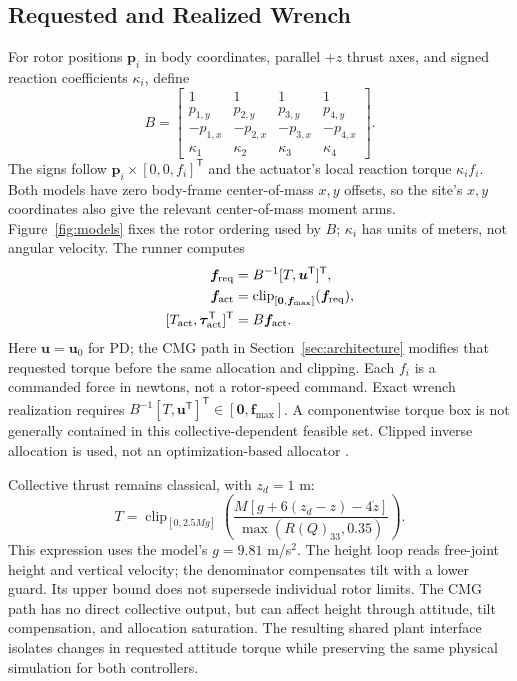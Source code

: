 \documentclass[letterpaper,10pt,conference]{IEEEtran}
\newcommand{\T}{^{\mathsf T}}
\newcommand{\clip}{\operatorname{clip}}
\begin{document}
\subsection{Requested and Realized Wrench}
For rotor positions $\bm p_i$ in body coordinates, parallel $+z$ thrust
axes, and signed reaction coefficients $\kappa_i$, define
\begin{equation}
 B=\begin{bmatrix}
 1&1&1&1\\p_{1,y}&p_{2,y}&p_{3,y}&p_{4,y}\\
 -p_{1,x}&-p_{2,x}&-p_{3,x}&-p_{4,x}\\
 \kappa_1&\kappa_2&\kappa_3&\kappa_4
 \end{bmatrix}.
 \label{eq:allocationmatrix}
\end{equation}
The signs follow $\bm p_i\times[0,0,f_i]\T$ and the actuator's local
reaction torque $\kappa_i f_i$. Both models have zero body-frame
center-of-mass $x,y$ offsets, so the site's $x,y$ coordinates also give
the relevant center-of-mass moment arms. Figure~\ref{fig:models} fixes the
rotor ordering used by $B$; $\kappa_i$ has units of meters, not angular
velocity. The runner computes
\begin{equation}
 \begin{aligned}
 \bm f_{\rm req}&=B^{-1}[T,\bm u\T]\T,\\
 \bm f_{\rm act}&=\clip_{[\bm0,\bm f_{\max}]}(\bm f_{\rm req}),\\
 [T_{\rm act},\bm\tau_{\rm act}\T]\T&=B\bm f_{\rm act}.
 \end{aligned}
 \label{eq:mixer}
\end{equation}
Here $\bm u=\bm u_0$ for PD; the CMG path in Section~\ref{sec:architecture}
modifies that requested torque before the same allocation and clipping.
Each $f_i$ is a commanded force in newtons, not a rotor-speed command.
Exact wrench realization requires
$B^{-1}[T,\bm u\T]\T\in[\bm0,\bm f_{\max}]$.
A componentwise torque box is not generally contained in this
collective-dependent feasible set. Clipped inverse allocation is used,
not an optimization-based allocator \cite{monteiro2016allocation}.

Collective thrust remains classical, with $z_d=1$ m:
\begin{equation}
 T=\clip_{[0,2.5Mg]}
 \left(\frac{M[g+6(z_d-z)-4\dot z]}{\max(R(Q)_{33},0.35)}\right).
 \label{eq:collective}
\end{equation}
This expression uses the model's $g=9.81$ m/s$^2$. The height loop reads
free-joint height and vertical velocity; the denominator compensates tilt
with a lower guard. Its upper bound does not supersede individual rotor
limits. The CMG path has no direct collective output, but can affect
height through attitude, tilt compensation, and allocation saturation.
The resulting shared plant interface isolates changes in requested
attitude torque while preserving the same physical simulation for both
controllers.
\end{document}
